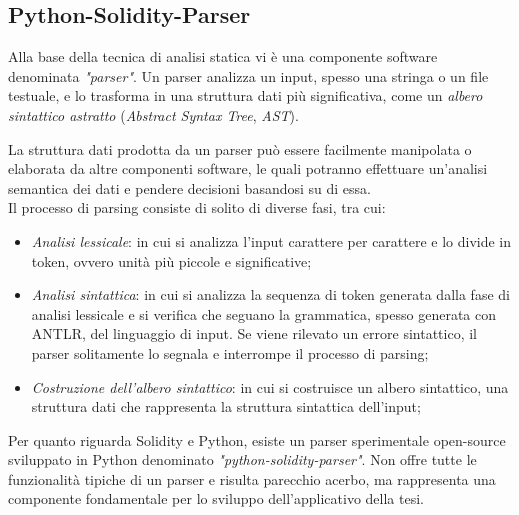 {\subsection{Python-Solidity-Parser}
Alla base della tecnica di analisi statica vi è una componente software denominata \textit{"parser"}. Un parser analizza un input, spesso una stringa o un file testuale, e lo trasforma in una struttura dati più significativa, come un\textit{ albero sintattico astratto} (\textit{Abstract Syntax Tree}, \textit{AST}).\par
La struttura dati prodotta da un parser può essere facilmente manipolata o elaborata da altre componenti software, le quali potranno effettuare un'analisi semantica dei dati e pendere decisioni basandosi su di essa.\\ \newline
Il processo di parsing consiste di solito di diverse fasi, tra cui:
\begin{itemize}
	\item \textit{Analisi lessicale}: in cui si analizza l'input carattere per carattere e lo divide in token, ovvero unità più piccole e significative;
	\item \textit{Analisi sintattica}: in cui si analizza la sequenza di token generata dalla fase di analisi lessicale e si verifica che seguano la grammatica, spesso generata con ANTLR\cite{ANTLR}, del linguaggio di input. Se viene rilevato un errore sintattico, il parser solitamente lo segnala e interrompe il processo di parsing;
	\item \textit{Costruzione dell'albero sintattico}: in cui si costruisce un albero sintattico, una struttura dati che rappresenta la struttura sintattica dell'input;
\end{itemize}
Per quanto riguarda Solidity e Python, esiste un parser sperimentale open-source sviluppato in Python denominato \textit{"python-solidity-parser"}\cite{python-solidity-parser}. Non offre tutte le funzionalità tipiche di un parser e risulta parecchio acerbo, ma rappresenta una componente fondamentale per lo sviluppo dell'applicativo della tesi.
}
